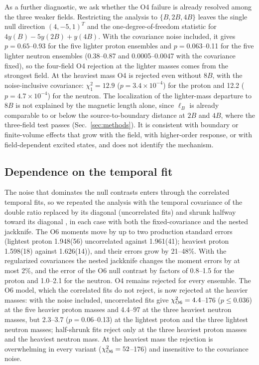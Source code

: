 \documentclass[aps,prd,reprint,twocolumn,superscriptaddress,nofootinbib,longbibliography]{revtex4-2}
\begin{document}
As a further diagnostic, we ask whether the O4 failure is already resolved among the three weaker fields. Restricting the analysis to $\{B,2B,4B\}$ leaves the single null direction $(4,-5,1)^T$ and the one-degree-of-freedom statistic for $4y(B)-5y(2B)+y(4B)$. With the covariance noise included, it gives $p=0.65$--0.93 for the five lighter proton ensembles and $p=0.063$--0.11 for the five lighter neutron ensembles (0.38--0.87 and 0.0005--0.0047 with the covariance fixed), so the four-field O4 rejection at the lighter masses comes from the strongest field. At the heaviest mass O4 is rejected even without $8B$, with the noise-inclusive covariance: $\chi^2_1=12.9$ ($p=3.4\times10^{-4}$) for the proton and 12.2 ($p=4.7\times10^{-4}$) for the neutron. The localization of the lighter-mass departure to $8B$ is not explained by the magnetic length alone, since $\ell_B$ is already comparable to or below the source-to-boundary distance at $2B$ and $4B$, where the three-field test passes (Sec.~\ref{sec:methods}). It is consistent with boundary or finite-volume effects that grow with the field, with higher-order response, or with field-dependent excited states, and does not identify the mechanism.

\subsection{Dependence on the temporal fit}
\label{sec:tempreg}

The noise that dominates the null contrasts enters through the correlated temporal fits, so we repeated the analysis with the temporal covariance of the double ratio replaced by its diagonal (uncorrelated fits) and shrunk halfway toward its diagonal \cite{Michael1994,MichaelMcKerrell1995,LedoitWolf2004}, in each case with both the fixed-covariance and the nested jackknife. The O6 moments move by up to two production standard errors (lightest proton 1.948(56) uncorrelated against 1.961(41); heaviest proton 1.598(18) against 1.626(14)), and their errors grow by 21--48\%. With the regularized covariances the nested jackknife changes the moment errors by at most 2\%, and the error of the O6 null contrast by factors of 0.8--1.5 for the proton and 1.0--2.1 for the neutron. O4 remains rejected for every ensemble. The O6 model, which the correlated fits do not reject, is now rejected at the heavier masses: with the noise included, uncorrelated fits give $\chi^2_{\rm O6}=4.4$--176 ($p\le0.036$) at the five heavier proton masses and 4.4--97 at the three heaviest neutron masses, but 2.3--3.7 ($p=0.06$--0.13) at the lightest proton and the three lightest neutron masses; half-shrunk fits reject only at the three heaviest proton masses and the heaviest neutron mass. At the heaviest mass the rejection is overwhelming in every variant ($\chi^2_{\rm O6}=52$--176) and insensitive to the covariance noise.
\end{document}
